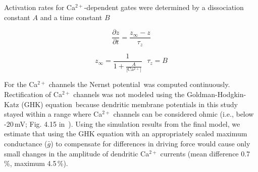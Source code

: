 \documentclass[12pt]{article}
\begin{document}
Activation rates for Ca$^{2+}$-dependent gates were determined by a dissociation constant $A$ and a time constant $B$

\begin{equation}
   \frac{\partial z}{\partial t} = \frac{z_\infty - z}{\tau_z}
\end{equation}

\begin{equation}
   z_\infty = \frac{1}{1+\frac{A}{\mbox{[Ca$^{2+}$]}}} \mbox{        }\tau_z = B
\end{equation}

For the Ca$^{2+}$ channels the Nernst potential\,\cite{B:1991zr} was
computed continuously. Rectification of
Ca$^{2+}$ channels was not modeled using the Goldman-Hodgkin-Katz (GHK) equation\,\cite{B:1991zr}
because dendritic membrane potentials in this
study stayed within a range where Ca$^{2+}$  channels can be considered
ohmic (i.e., below -20\,mV; Fig. 4.15 in\,\cite{B:1991zr} ). Using
the simulation results from the final model, we estimate that using
the GHK equation with an appropriately scaled maximum conductance
($\bar g$) to compensate for differences in driving force would
cause only small changes in the amplitude of dendritic Ca$^{2+}$
currents (mean difference 0.7\,\%, maximum 4.5\,\%).




\end{document}
